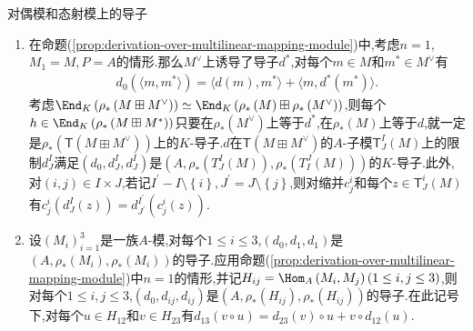 \begin{example}{对偶模和态射模上的导子}{}
	\begin{enumerate}
		\item 在命题(\cref{prop:derivation-over-multilinear-mapping-module})中,考虑$n=1$,$M_{1}=M,P=A$的情形.那么$M^{\vee}$上诱导了导子$d^{\ast}$,对每个$m\in M$和$m^{\ast}\in M^{\vee}$有
		\begin{align*}
			d_{0}\left(\langle m,m^{\ast}\rangle\right)=\langle d\left(m\right),m^{\ast}\rangle+\langle m,d^{\ast}\left(m^{\ast}\right)\rangle.
		\end{align*}
		考虑$\End_{K}\left(\rho_{\ast}\left(M\boxplus M^{\vee}\right)\right)\simeq\End_{K}\left(\rho_{\ast}\left(M\right)\boxplus\rho_{\ast}\left(M^{\vee}\right)\right)$,则每个$h\in\End_{K}\left(\rho_{\ast}\left(M\boxplus M^{\ast}\right)\right)$只要在$\rho_{\ast}\left(M^{\vee}\right)$上等于$d^{\ast}$,在$\rho_{\ast}\left(M\right)$上等于$d$,就一定是$\rho_{\ast}\left(\mathsf{T}\left(M\boxplus M^{\vee}\right)\right)$上的$K$-导子.$d$在$\mathsf{T}\left(M\boxplus M^{\vee}\right)$的$A$-子模$\mathsf{T}_{J}^{I}\left(M\right)$上的限制$d_{J}^{I}$满足$\left(d_{0},d_{J}^{I},d_{J}^{I}\right)$是$\left(A,\rho_{\ast}\left(T_{J}^{I}\left(M\right)\right),\rho_{\ast}\left(T_{I}^{J}\left(M\right)\right)\right)$的$K$-导子.此外,对$\left(i,j\right)\in I\times J$,若记$I^{\prime}-I\setminus\left\{i\right\},J^{\prime}=J\setminus\left\{j\right\}$,则对缩并$c_{j}^{i}$和每个$z\in\mathsf{T}_{J}^{i}\left(M\right)$有$c_{j}^{i}\left(d_{J}^{I}\left(z\right)\right)=d_{J^{\prime}}^{I^{\prime}}\left(c_{j}^{i}\left(z\right)\right)$.
		\item 设$\left(M_{i}\right)_{i=1}^{3}$是一族$A$-模,对每个$1\leq i\leq 3$,$\left(d_{0},d_{1},d_{1}\right)$是$\left(A,\rho_{\ast}\left(M_{i}\right),\rho_{\ast}\left(M_{i}\right)\right)$的导子.应用命题(\cref{prop:derivation-over-multilinear-mapping-module})中$n=1$的情形,并记$H_{ij}=\Hom_{A}\left(M_{i},M_{j}\right)\left(1\leq i,j\leq 3\right)$,则对每个$1\leq i,j\leq 3$,$\left(d_{0},d_{ij},d_{ij}\right)$是$\left(A,\rho_{\ast}\left(H_{ij}\right),\rho_{\ast}\left(H_{ij}\right)\right)$的导子.在此记号下,对每个$u\in H_{12}$和$v\in H_{23}$有$d_{13}\left(v\circ u\right)=d_{23}\left(v\right)\circ u+v\circ d_{12}\left(u\right)$.
	\end{enumerate}
\end{example}










